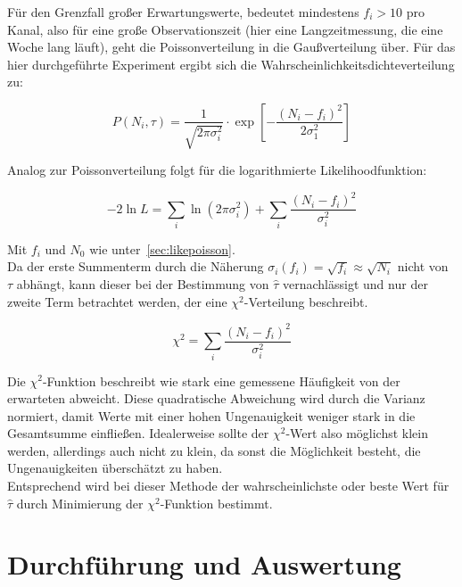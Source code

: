 \documentclass[slug=LM, room=Andreas-Schubert-Bau\,\ K\ 1A, supervisor=Anne-Sophie\ Berthold, coursedate=13.\ 12.\ 2019]{../../Lab_Report_LaTeX/lab_report}
\begin{document}
Für den Grenzfall großer Erwartungswerte, bedeutet mindestens \(f_i > 10\) pro Kanal, also für
eine große Observationszeit (hier eine Langzeitmessung, die eine Woche lang läuft), geht die
Poissonverteilung in die Gaußverteilung über. Für das hier durchgeführte Experiment ergibt sich
die Wahrscheinlichkeitsdichteverteilung zu:

\begin{equation}\label{eq:wahrgauss}
 P(N_i,\tau) = \frac{1}{\sqrt{2\pi \sigma_i^2}} \cdot \exp[-\frac{(N_i-f_i)^2}{2\sigma_1^2}]
\end{equation}

Analog zur Poissonverteilung folgt für die logarithmierte Likelihoodfunktion:

\begin{equation}\label{key}
 -2\ln L = \sum_{i}\ln (2\pi\sigma_i^2) + \sum_{i} \frac{(N_i - f_i)^2}{\sigma_i^2}
\end{equation}

Mit \(f_i\) und \(N_0\) wie unter~\ref{sec:likepoisson}. \\

Da der erste Summenterm durch die Näherung \(\sigma_i(f_i) = \sqrt{f_i} \approx \sqrt{N_i}\) nicht
von \(\tau\) abhängt, kann dieser bei der Bestimmung von \(\hat{\tau}\) vernachlässigt und nur
der zweite Term betrachtet werden, der eine \(\chi^2\)-Verteilung beschreibt.

\begin{equation}\label{eq:chi}
 \chi^2 = \sum_{i} \frac{(N_i - f_i)^2}{\sigma_i^2}
\end{equation}

Die \(\chi^2\)-Funktion beschreibt wie stark eine gemessene Häufigkeit von der erwarteten abweicht.
Diese quadratische Abweichung wird durch die Varianz normiert, damit Werte mit einer hohen
Ungenauigkeit weniger stark in die Gesamtsumme einfließen. Idealerweise sollte der \(\chi^2\)-Wert
also möglichst klein werden, allerdings auch nicht zu klein, da sonst die Möglichkeit besteht, die
Ungenauigkeiten überschätzt zu haben.\\

Entsprechend wird bei dieser Methode der wahrscheinlichste oder beste Wert für \(\hat\tau\) durch
Minimierung der \(\chi^2\)-Funktion bestimmt.

\section{Durchf\"uhrung und Auswertung}
\label{sec:durchaus}
\end{document}
